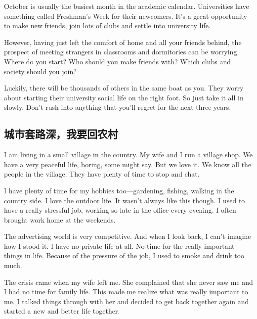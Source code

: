 October is usually the busiest month in the academic
calendar. Universities have something called Freshman's
Week for their newcomers. It's a great opportunity to make
new friends, join lots of clubs and settle into university
life.

However, having just left the comfort of home and all your
friends behind, the prospect of meeting strangers in classrooms
and dormitories can be worrying. Where do you
start? Who should you make friends with? Which clubs and
society should you join?

Luckily, there will be thousands of others in the same boat
as you. They worry about starting their university social life
on the right foot. So just take it all in slowly. Don't rush into
anything that you'll regret for the next three years.


\subsection{城市套路深，我要回农村}
\begin{margintable}\vspace{-2cm}\footnotesize
\end{margintable}

I am living in a small village in the country. My wife
and I run a village shop. We have a very peaceful life,
boring, some might say. But we love it. We know all the
people in the village. They have plenty of time to stop and
chat.

I have plenty of time for my hobbies too—gardening, fishing,
walking in the country side. I love the outdoor life.
It wasn't always like this though. I used to have a
really stressful job, working so late in the office every evening.
I often brought work home at the weekends.

The advertising world is very competitive. And when I look
back, I can't imagine how I stood it. I have no private life 
at all. No time for the really important things in life.
Because of the pressure of the job, I used to smoke and
drink too much.

The crisis came when my wife left me. She complained
that she never saw me and I had no time for family
life. This made me realize what was really important
to me. I talked things through with her and decided to get
back together again and started a new and better life together.

